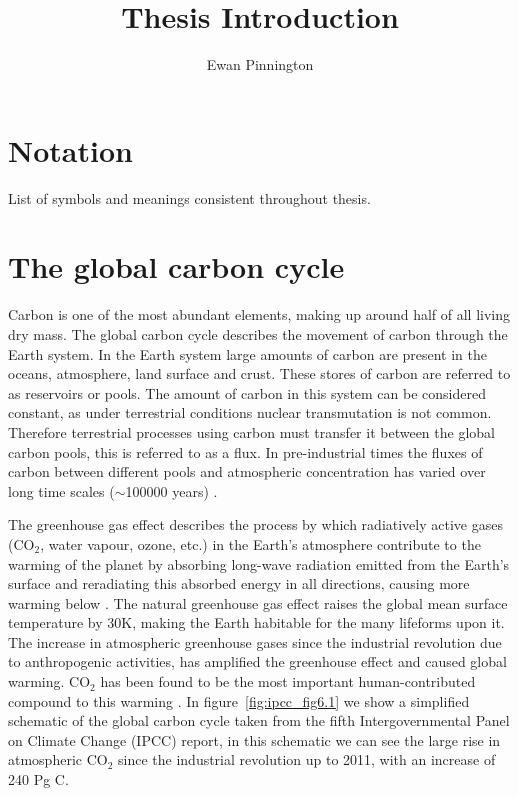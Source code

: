 \documentclass[11pt]{article}
\title{Thesis Introduction}
\author{Ewan Pinnington}
\begin{document}
\maketitle

\section{Notation}
List of symbols and meanings consistent throughout thesis.

\section{The global carbon cycle} \label{sec:global_c_cycle}

Carbon is one of the most abundant elements, making up around half of all living dry mass. The global carbon cycle describes the movement of carbon through the Earth system. In the Earth system large amounts of carbon are present in the oceans, atmosphere, land surface and crust. These stores of carbon are referred to as reservoirs or pools. The amount of carbon in this system can be considered constant, as under terrestrial conditions nuclear transmutation is not common. Therefore terrestrial processes using carbon must transfer it between the global carbon pools, this is referred to as a flux. In pre-industrial times the fluxes of carbon between different pools and atmospheric concentration has varied over long time scales (\(\sim\)100000 years) \citep{luthi2008high}.

The greenhouse gas effect describes the process by which radiatively active gases (CO\(_{2}\), water vapour, ozone, etc.) in the Earth's atmosphere contribute to the warming of the planet by absorbing long-wave radiation emitted from the Earth's surface and reradiating this absorbed energy in all directions, causing more warming below \citep{mitchell1989greenhouse}. The natural greenhouse gas effect raises the global mean surface temperature by 30K, making the Earth habitable for the many lifeforms upon it. The increase in atmospheric greenhouse gases since the industrial revolution due to anthropogenic activities, has amplified the greenhouse effect and caused global warming. CO\(_{2}\) has been found to be the most important human-contributed compound to this warming \citep{Falkowski291}. In figure~\ref{fig:ipcc_fig6.1} we show a simplified schematic of the global carbon cycle taken from the fifth Intergovernmental Panel on Climate Change (IPCC) report, in this schematic we can see the large rise in atmospheric CO\(_{2}\) since the industrial revolution up to 2011, with an increase of 240 Pg C.
\end{document}
